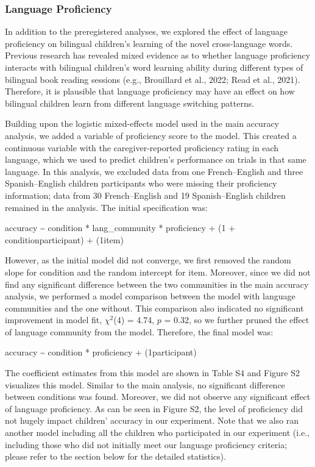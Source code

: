 \documentclass[
  man,floatsintext]{apa7}
\begin{document}
\hypertarget{language-proficiency}{%
\subsubsection{Language Proficiency}\label{language-proficiency}}

In addition to the preregistered analyses, we explored the effect of language proficiency on bilingual children's learning of the novel cross-language words. Previous research has revealed mixed evidence as to whether language proficiency interacts with bilingual children's word learning ability during different types of bilingual book reading sessions (e.g., Brouillard et al., 2022; Read et al., 2021). Therefore, it is plausible that language proficiency may have an effect on how bilingual children learn from different language switching patterns.

Building upon the logistic mixed-effects model used in the main accuracy analysis, we added a variable of proficiency score to the model. This created a continuous variable with the caregiver-reported proficiency rating in each language, which we used to predict children's performance on trials in that same language. In this analysis, we excluded data from one French--English and three Spanish--English children participants who were missing their proficiency information; data from 30 French--English and 19 Spanish--English children remained in the analysis. The initial specification was:

accuracy \textasciitilde{} condition * lang\_community * proficiency + (1 + condition\textbar participant) + (1\textbar item)

However, as the initial model did not converge, we first removed the random slope for condition and the random intercept for item. Moreover, since we did not find any significant difference between the two communities in the main accuracy analysis, we performed a model comparison between the model with language communities and the one without. This comparison also indicated no significant improvement in model fit, \(\chi^2\)(4) = 4.74, \(p\) = 0.32, so we further pruned the effect of language community from the model. Therefore, the final model was:

accuracy \textasciitilde{} condition * proficiency + (1\textbar participant)

\noindent The coefficient estimates from this model are shown in Table S4 and Figure S2 visualizes this model. Similar to the main analysis, no significant difference between conditions was found. Moreover, we did not observe any significant effect of language proficiency. As can be seen in Figure S2, the level of proficiency did not hugely impact children' accuracy in our experiment. Note that we also ran another model including all the children who participated in our experiment (i.e., including those who did not initially meet our language proficiency criteria; please refer to the section below for the detailed statistics).
\end{document}
